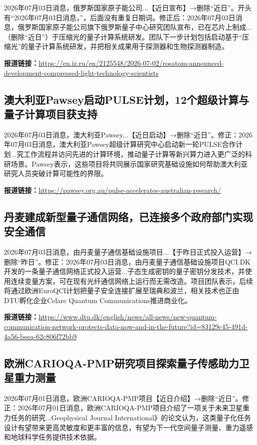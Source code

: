 \documentclass[12pt,a4paper]{ctexart}
\begin{document}
2026年07月03日消息，俄罗斯国家原子能公司...【近日宣布】→删除“近日”。开头有“2026年07月03日消息，”，后面没有重复日期词。修正后：2026年07月03日消息，俄罗斯国家原子能公司旗下俄罗斯量子中心研究团队宣布，已在芯片上制成...（删除“近日”）于压缩光的量子计算系统研发。团队下一步计划包括启动基于“压缩光”的量子计算系统研发，并把相关成果用于探测器和生物探测器制造。

\noindent\textbf{报道链接：}\url{https://en.iz.ru/en/2125548/2026-07-02/rosatom-announced-development-compressed-light-technology-scientists}

\subsection{ 澳大利亚Pawsey启动PULSE计划，12个超级计算与量子计算项目获支持 }

2026年07月03日消息，澳大利亚Pawsey...【近日启动】→删除“近日”。修正：2026年07月03日消息，澳大利亚Pawsey超级计算研究中心启动新一轮PULSE合作计划...究工作流程并访问先进的计算环境，推动量子计算等新兴算力进入更广泛的科研场景。Pawsey表示，这些项目将共同展示国家研究基础设施如何帮助澳大利亚研究人员突破计算可能性的界限。

\noindent\textbf{报道链接：}\url{https://pawsey.org.au/pulse-accelerates-australian-research/}

\subsection{ 丹麦建成新型量子通信网络，已连接多个政府部门实现安全通信 }

2026年07月03日消息，由丹麦量子通信基础设施项目...【于昨日正式投入运营】→删除“昨日”。修正：2026年07月03日消息，由丹麦量子通信基础设施项目QCI.DK开发的一条量子通信网络正式投入运营...子态生成密钥的量子密钥分发技术，并使用连续变量方案，可在现有光纤通信网络上运行而无需改造。项目团队表示，后续将通过欧洲EuroQCI计划把量子安全连接扩展至瑞典和波兰，相关技术也正由DTU孵化企业Celare Quantum Communications推进商业化。

\noindent\textbf{报道链接：}\url{https://www.dtu.dk/english/news/all-news/new-quantum-communication-network-protects-data-now-and-in-the-future?id=83129c45-491d-4a56-beea-62c806f72bb9}

\subsection{ 欧洲CARIOQA-PMP研究项目探索量子传感助力卫星重力测量 }

2026年07月01日消息，欧洲CARIOQA-PMP项目【近日介绍】→删除“近日”。修正：2026年07月01日消息，欧洲CARIOQA-PMP项目介绍了一项关于未来卫星重力任务的研究...Geophysical Journal International》的论文认为，这类量子化任务设计有望带来更高灵敏度和更丰富的信息，有望为下一代空间量子测量、重力遥感和地球科学任务提供技术依据。
\end{document}
